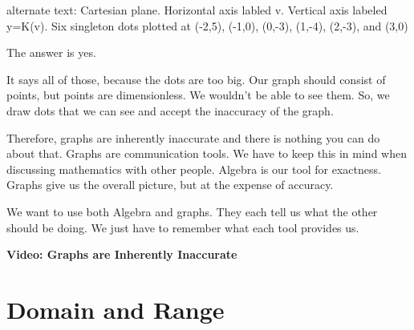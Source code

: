 \documentclass{ximera}
\begin{document}
\textcolor{gray!90}{alternate text: Cartesian plane. Horizontal axis labled v. Vertical axis labeled y=K(v). Six singleton dots plotted at (-2,5), (-1,0), (0,-3), (1,-4), (2,-3), and (3,0)}




The answer is yes.  


It says all of those, because the dots are too big.  Our graph should consist of points, but points are dimensionless.  We wouldn't be able to see them.  So, we draw dots that we can see and accept the inaccuracy of the graph.

Therefore, graphs are inherently inaccurate and there is nothing you can do about that.  Graphs are communication tools. We have to keep this in mind when discussing mathematics with other people. Algebra is our tool for exactness.  Graphs give us the overall picture, but at the expense of accuracy.

We want to use both Algebra and graphs.  They each tell us what the other should be doing.  We just have to remember what each tool provides us.








\begin{explanation} \textbf{\textcolor{red!75!green}{Video: Graphs are Inherently Inaccurate}}


\begin{onlineOnly}
\begin{expandable} 

\begin{center}
\end{center}

\end{expandable}
\end{onlineOnly}

\end{explanation}














\section*{Domain and Range}
\end{document}
